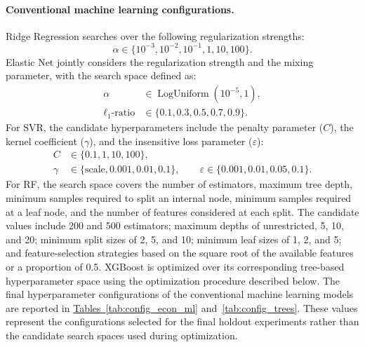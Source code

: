 \documentclass[runningheads,orivec]{llncs}
\begin{document}
\paragraph{Conventional machine learning configurations.} Ridge Regression searches over the following regularization strengths:
\begin{equation}
\alpha \in \{10^{-3},10^{-2},10^{-1},1,10,100\}.
\end{equation}
Elastic Net jointly considers the regularization strength and the mixing parameter, with the search space defined as:
\begin{equation}
\begin{aligned}
\alpha &\in \operatorname{LogUniform}(10^{-5},1),\\
\ell_1\text{-ratio} &\in \{0.1,0.3,0.5,0.7,0.9\}.
\end{aligned}
\end{equation}
For SVR, the candidate hyperparameters include the penalty parameter ($C$), the kernel coefficient ($\gamma$), and the insensitive loss parameter ($\varepsilon$):
\begin{equation}
\begin{aligned}
C &\in \{0.1,1,10,100\},\\
\gamma &\in \{\text{scale},0.001,0.01,0.1\},
\qquad
\varepsilon \in \{0.001,0.01,0.05,0.1\}.
\end{aligned}
\end{equation}
For RF, the search space covers the number of estimators, maximum tree depth, minimum samples required to split an internal node, minimum samples required at a leaf node, and the number of features considered at each split. The candidate values include 200 and 500 estimators; maximum depths of unrestricted, 5, 10, and 20; minimum split sizes of 2, 5, and 10; minimum leaf sizes of 1, 2, and 5; and feature-selection strategies based on the square root of the available features or a proportion of 0.5. XGBoost is optimized over its corresponding tree-based hyperparameter space using the optimization procedure described below. The final hyperparameter configurations of the conventional machine learning models are reported in \hyperref[tab:config_econ_ml]{Tables~\ref*{tab:config_econ_ml}} and~\hyperref[tab:config_trees]{\ref*{tab:config_trees}}. These values represent the configurations selected for the final holdout experiments rather than the candidate search spaces used during optimization.
\end{document}
